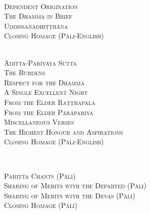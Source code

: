 {  \clearpage

  {\libertinusFont\selectfont\textbf{\textsc{}}}\\

  \textsc{
    Dependent Origination \pageref{dependent-origination}\\
    The Dhamma in Brief \pageref{dhamma-in-brief}\\
    Uddissanādhiṭṭhāna \pageref{uddissanadhitthana}\\
    Closing Homage (Pāli-English) \pageref{closing-homage}}\\


  {\libertinusFont\selectfont\textbf{\textsc{}}}\\

  \textsc{
    Āditta-Pariyāya Sutta \pageref{aditta-pariyaya}\\
    The Burdens \pageref{burdens}\\
    Respect for the Dhamma \pageref{respect-for-the-dhamma}\\
    A Single Excellent Night \pageref{single-excellent-night}\\
    From the Elder Raṭṭhapāla \pageref{ratthapala}\\
    From the Elder Pārāpariya \pageref{parapariya}\\
    Miscellaneous Verses \pageref{misc-verses}\\
    The Highest Honour and Aspirations \pageref{highest-honour-aspirations}\\
    Closing Homage (Pāli-English) \pageref{closing-homage}}\\

  \clearpage

  {\libertinusFont\selectfont\textbf{\textsc{}}}\\

  \textsc{
    Paritta Chants (Pāli) \pageref{deva-aradhana}\\
    Sharing of Merits with the Departed (Pāli) \pageref{sharing-merits-departed}\\
    Sharing of Merits with the Devas (Pāli) \pageref{sharing-merits-devas}\\
    Closing Homage (Pāli) \pageref{closing-homage}}\\

}
